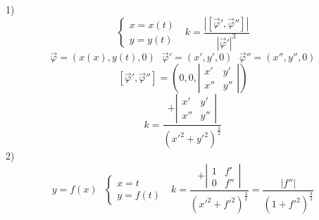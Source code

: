 \begin{block}
  1)
  $$
  \left\{
  \begin{array}{l}
    x = x(t) \\
    y = y(t)
  \end{array}
  \right. ~~~
  k = \frac{|[\vec \varphi', \vec \varphi'']|}{|\vec \varphi'|^3}
  $$
  $$
  \vec \varphi = (x(x), y(t), 0) ~~~
  \vec \varphi' = (x', y', 0) ~~~
  \vec \varphi'' = (x'', y'', 0)
  $$
  $$
  [\vec \varphi', \vec \varphi''] = \left(0, 0,
  \left|
  \begin{array}{cc}
    x' & y' \\
    x'' & y''
  \end{array}
  \right| \right)
  $$
  $$
  k = \frac{
  + \left|
  \begin{array}{cc}
    x' & y' \\
    x'' & y''
  \end{array}
  \right|
  }{(x'^2 + y'^2)^{\frac{3}{2}}}
  $$
  2)
  $$
  y = f(x) ~~~
  \left\{
  \begin{array}{l}
    x = t \\
    y = f(t)
  \end{array}
  \right. ~~~
  k = \frac{
  + \left|
  \begin{array}{cc}
    1 & f' \\
    0 & f''
  \end{array}
  \right|
  }{(x'^2 + f'^2)^{\frac{3}{2}}}
  =
  \frac{|f''|}{(1 + f'^2)^{\frac{3}{2}}}
  $$
\end{block}